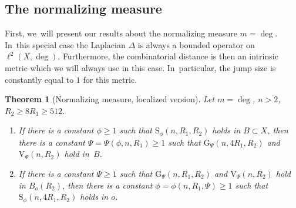 \documentclass[JEP,XML,SOM,Unicode,published]{cedram}
\newenvironment{enumeratei}
{\bgroup\def\theenumi{\roman{enumi}}\def\theenumii{\arabic{enumii}}\begin{enumerate}}
{\end{enumerate}\egroup}
\newcommand{\rG}{\mathrm{G}}
\newcommand{\rS}{\mathrm{S}}
\newcommand{\rV}{\mathrm{V}}
\theoremstyle{plain}
\newtheorem{theorem}{Theorem}[section]
\theoremstyle{definition}
\begin{document}
\subsection*{The normalizing measure}
First, we~will present our results about the normalizing measure $m=\deg$. In~this special case the Laplacian $ \Delta $ is always a bounded operator on $ \ell^{2}(X,\deg) $. Furthermore, the combinatorial distance is then an intrinsic metric which we will always use in this case. In~particular, the jump size is constantly equal to $ 1 $ for this metric.
\begin{theorem}[Normalizing measure, localized version]\label{thm:equivnormalized}Let $ m=\deg $, {$n>2$}, $ R_2\geq 8 R_1\geq 512$.
\begin{enumeratei}
\item If there is a constant $\phi\geq 1$ such that $\rS_\phi (n,R_1,R_2)$ holds in $B\subset X$, then there {is a constant} $\Psi=\Psi(\phi,n,R_1)\geq 1$ such that $\rG_{\Psi}(n,4R_1,R_2)$ and $\rV_{{\Psi}}(n,R_2)$ hold in~$B$.
\item
If there {is a constant $\Psi\geq 1$} such that $\rG_{\Psi}(n,R_1,R_2)$ and $\rV_{{\Psi}}(n,R_2)$ hold in $B_o(R_2)$, then there is a constant $\phi=\phi(n,R_1,\Psi)\geq 1$ such that $\rS_{\phi}(n,4R_1,R_2)$ holds in $o$.
\end{enumeratei}
\end{theorem}
\end{document}
